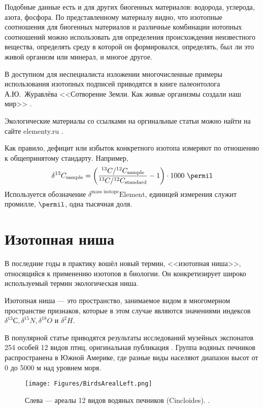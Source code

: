 \documentclass[a5paper,openany]{book}
\begin{document}
Подобные данные есть и для других биогенных материалов: водорода, углерода, азота, фосфора. 
По представленному материалу видно, что изотопные соотношения для биогенных материалов и различные комбинации  иотопных соотношений можно использовать для определения происхождения неизвестного вещества, определять среду в которой он формировался, определять, был ли это живой организм или минерал, и многое другое. 

В доступном для неспециалиста изложении многочисленные примеры использования изотопных подписей приводятся в книге палеонтолога А.Ю.~Журавлёва <<Сотворение Земли. Как живые организмы создали наш мир>> \cite{Zhuravlev2019}.

Экологические материалы со ссылками на оргинальные статьи можно найти на сайте elementy.ru \cite{OpaevIsotope}.

Как правило, дефицит или избыток конкретного изотопа измеряют по отношению к общепринятому стандарту. Например,
\begin{equation*}
\delta^{13}C_{\text{sample}} = \left( \frac{^{13}C/^{12}C_{\text{sample}}}{^{13}C/^{12}C_{\text{standard}}} - 1\right) \cdot 1000 \ \permil
\end{equation*}
Используется обозначение $\delta^{\text{mass isotope}}\text{Element}$, единицей измерения служит промилле, $\permil$, одна тысячная доля.


\section{Изотопная ниша}\label{s:IsotopeNiche}

В последние годы в практику вошёл новый термин, <<изотопная ниша>>, относящийся к применению изотопов в биологии. Он конкретизирует широко используемый термин экологическая ниша. 

Изотопная ниша — это пространство, занимаемое видом в многомерном пространстве признаков, которые в этом случае являются значениями индексов $\delta^{13}С, \delta^{15}N, \delta^{18}O \text{ и } \delta^{2}H$. 

В популярной статье \cite{OpaevIsotope} приводятся результаты исследований музейных экспонатов 254 особей 12 видов птиц, оригинальная публикация \cite{Rader2017}.  Группа водяных печников распространена в Южной Америке, где разные виды населяют диапазон высот от 0 до 5000 м над уровнем моря.
\begin{figure}[ht] 
	\centering\small
	\unitlength=1mm
	{\texttt{[image: Figures/BirdsArealLeft.png]}} 
	\caption {Слева — ареалы 12 видов водяных печников (Cincloides). \cite{Rader2017}.} %
	\label{f:BirdsAreal}
\end{figure}
\end{document}
